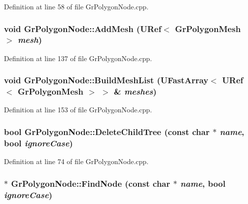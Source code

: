 Definition at line 58 of file GrPolygonNode.cpp.\hypertarget{class_gr_polygon_node_b75318e7bef982eced7f960f10df8bb9}{
\subsubsection[{AddMesh}]{\setlength{\rightskip}{0pt plus 5cm}void GrPolygonNode::AddMesh ({\bf URef}$<$ {\bf GrPolygonMesh} $>$ {\em mesh})}}
\label{class_gr_polygon_node_b75318e7bef982eced7f960f10df8bb9}




Definition at line 137 of file GrPolygonNode.cpp.\hypertarget{class_gr_polygon_node_3391bb965d15d459bbc12888f7ced8b6}{
\subsubsection[{BuildMeshList}]{\setlength{\rightskip}{0pt plus 5cm}void GrPolygonNode::BuildMeshList ({\bf UFastArray}$<$ {\bf URef}$<$ {\bf GrPolygonMesh} $>$ $>$ \& {\em meshes})}}
\label{class_gr_polygon_node_3391bb965d15d459bbc12888f7ced8b6}




Definition at line 153 of file GrPolygonNode.cpp.\hypertarget{class_gr_polygon_node_b7fbedae6034da769fb5bdec3e2da288}{
\subsubsection[{DeleteChildTree}]{\setlength{\rightskip}{0pt plus 5cm}bool GrPolygonNode::DeleteChildTree (const char $\ast$ {\em name}, \/  bool {\em ignoreCase})}}
\label{class_gr_polygon_node_b7fbedae6034da769fb5bdec3e2da288}




Definition at line 74 of file GrPolygonNode.cpp.\hypertarget{class_gr_polygon_node_cd3a36f25dcfa15dc007a2ac2c7c13d5}{
\subsubsection[{FindNode}]{ $\ast$ GrPolygonNode::FindNode (const char $\ast$ {\em name}, \/  bool {\em ignoreCase})}}
\label{class_gr_polygon_node_cd3a36f25dcfa15dc007a2ac2c7c13d5}




